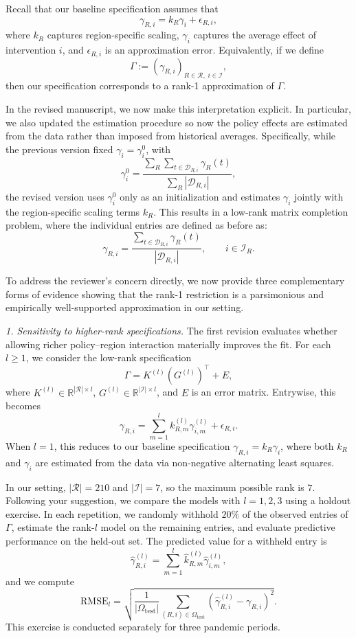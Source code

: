 \documentclass[letterpaper,twoside,11pt]{reviewresponse}
\begin{document}
 Recall that our baseline specification assumes that
 \[
 \gamma_{R,i} = k_R \gamma_i + \epsilon_{R,i},
 \]
 where $k_R$ captures region-specific scaling, $\gamma_i$ captures the average effect of intervention $i$, and $\epsilon_{R,i}$ is an approximation error. Equivalently, if we define
 \[
 \Gamma := (\gamma_{R,i})_{R \in \mathcal{R},\; i \in \mathcal{I}},
 \]
 then our specification corresponds to a rank-1 approximation of $\Gamma$.
 
 In the revised manuscript, we now make this interpretation explicit. In particular, we also updated the estimation procedure so now the policy effects are estimated from the data rather than imposed from historical averages. Specifically, while the previous version fixed $\gamma_i=\gamma_i^0$, with
 \[
 \gamma_i^0 = \frac{\sum_{R} \sum_{t \in \mathcal{D}_{R,i}} \gamma_R(t)}{\sum_{R} |\mathcal{D}_{R,i}|},
 \]
 the revised version uses $\gamma_i^0$ only as an initialization and estimates $\gamma_i$ jointly with the region-specific scaling terms $k_R$. This results in a low-rank matrix completion problem, where the individual entries are defined as before as:
 \[
 \gamma_{R,i} = \frac{\sum_{t \in \mathcal{D}_{R,i}} \gamma_R(t)}{|\mathcal{D}_{R,i}|},
 \qquad i \in \mathcal{I}_R.
 \]
 
 To address the reviewer's concern directly, we now provide three complementary forms of evidence showing that the rank-1 restriction is a parsimonious and empirically well-supported approximation in our setting.
 
 \textit{1. Sensitivity to higher-rank specifications.}  
 The first revision evaluates whether allowing richer policy--region interaction materially improves the fit. For each $l \geq 1$, we consider the low-rank specification
 \[
 \Gamma = K^{(l)}(G^{(l)})^\top + E,
 \]
 where $K^{(l)} \in \mathbb{R}^{|\mathcal{R}| \times l}$, $G^{(l)} \in \mathbb{R}^{|\mathcal{I}| \times l}$, and $E$ is an error matrix. Entrywise, this becomes
 \[
 \gamma_{R,i} = \sum_{m=1}^l k^{(l)}_{R,m} \gamma^{(l)}_{i,m} + \epsilon_{R,i}.
 \]
 When $l=1$, this reduces to our baseline specification $\gamma_{R,i}=k_R \gamma_i$, where both $k_R$ and $\gamma_i$ are estimated from the data via non-negative alternating least squares.
 
 In our setting, $|\mathcal{R}|=210$ and $|\mathcal{I}|=7$, so the maximum possible rank is $7$. Following your suggestion, we compare the models with $l=1,2,3$ using a holdout exercise. In each repetition, we randomly withhold $20\%$ of the observed entries of $\Gamma$, estimate the rank-$l$ model on the remaining entries, and evaluate predictive performance on the held-out set. The predicted value for a withheld entry is
 \[
 \hat{\gamma}_{R,i}^{(l)} = \sum_{m=1}^l \hat{k}^{(l)}_{R,m}\hat{\gamma}^{(l)}_{i,m},
 \]
 and we compute
 \[
 \mathrm{RMSE}_l
 =
 \sqrt{
 	\frac{1}{|\Omega_{\mathrm{test}}|}
 	\sum_{(R,i)\in\Omega_{\mathrm{test}}}
 	\left(
 	\hat{\gamma}_{R,i}^{(l)} - \gamma_{R,i}
 	\right)^2
 }.
 \]
 This exercise is conducted separately for three pandemic periods.
 
\end{document}

